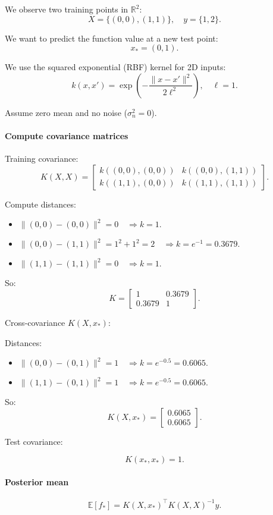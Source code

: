 We observe two training points in $\mathbb{R}^2$:
$$
X = \{(0,0), (1,1)\}, \quad y = \{1, 2\}.
$$

We want to predict the function value at a new test point:
$$
x_* = (0,1).
$$

We use the squared exponential (RBF) kernel for 2D inputs:
$$
k(x, x') = \exp\!\left(-\frac{\|x - x'\|^2}{2\ell^2}\right), \quad \ell = 1.
$$

Assume zero mean and no noise ($\sigma_n^2 = 0$).

\paragraph{Compute covariance matrices}

Training covariance:
$$
K(X,X) =
\begin{bmatrix}
k((0,0),(0,0)) & k((0,0),(1,1)) \\
k((1,1),(0,0)) & k((1,1),(1,1))
\end{bmatrix}.
$$

Compute distances:
\begin{itemize}
	\item $\|(0,0) - (0,0)\|^2 = 0 \quad \Rightarrow k=1.$
	\item $\|(0,0) - (1,1)\|^2 = 1^2+1^2 = 2 \quad \Rightarrow k=e^{-1}=0.3679.$
	\item $\|(1,1) - (1,1)\|^2 = 0 \quad \Rightarrow k=1.$
\end{itemize}


So:
$$
K =
\begin{bmatrix}
1 & 0.3679 \\
0.3679 & 1
\end{bmatrix}.
$$

Cross-covariance $K(X, x_*)$:

Distances:
\begin{itemize}
	\item $\|(0,0) - (0,1)\|^2 = 1 \quad \Rightarrow k=e^{-0.5}=0.6065.$
	\item $\|(1,1) - (0,1)\|^2 = 1 \quad \Rightarrow k=e^{-0.5}=0.6065.$
\end{itemize}

So:
$$
K(X, x_*) =
\begin{bmatrix}
0.6065 \\
0.6065
\end{bmatrix}.
$$

Test covariance:

$$
K(x_*, x_*) = 1.
$$

\paragraph{Posterior mean}
$$
\mathbb{E}[f_*] = K(X,x_*)^\top K(X,X)^{-1} y.
$$

